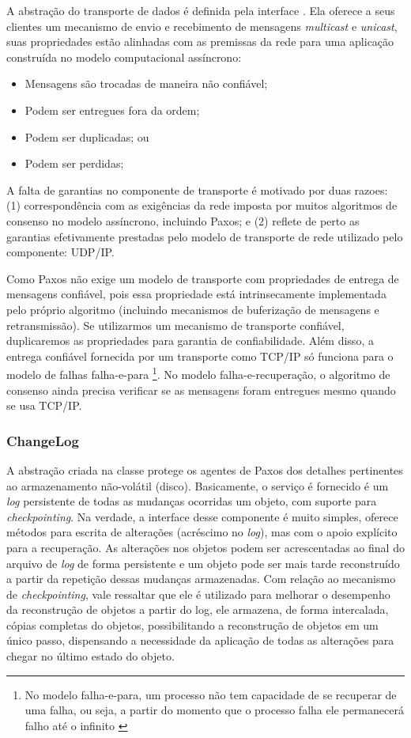 A abstração do transporte de dados é definida pela interface . Ela
oferece a seus clientes um mecanismo de envio e recebimento de mensagens \emph{multicast}
e \emph{unicast}, suas propriedades estão alinhadas com as premissas da rede para uma
aplicação construída no modelo computacional assíncrono:

\begin{itemize}
  \item Mensagens são trocadas de maneira não confiável;
  \item Podem ser entregues fora da ordem;
  \item Podem ser duplicadas; ou
  \item Podem ser perdidas;
\end{itemize}

A falta de garantias no componente de transporte é motivado por duas razoes: (1)
correspondência com as exigências da rede imposta por muitos algoritmos de consenso no
modelo assíncrono, incluindo Paxos; e (2) reflete de perto as garantias efetivamente
prestadas pelo modelo de transporte de rede utilizado pelo componente: UDP/IP.

Como Paxos não exige um modelo de transporte com propriedades de entrega de mensagens
confiável, pois essa propriedade está intrinsecamente implementada pelo próprio algoritmo
(incluindo mecanismos de buferização de mensagens e retransmissão). Se utilizarmos um
mecanismo de transporte confiável, duplicaremos as propriedades para garantia de
confiabilidade. Além disso, a entrega confiável fornecida por um transporte como TCP/IP só
funciona para o modelo de falhas falha-e-para \cite{abdellatif04} \footnote{No modelo
falha-e-para, um processo não tem capacidade de se recuperar de uma falha, ou seja, a
partir do momento que o processo falha ele permanecerá falho até o infinito
\cite{cachin11}}. No modelo falha-e-recuperação, o algoritmo de consenso ainda precisa
verificar se as mensagens foram entregues mesmo quando se usa TCP/IP.

\subsubsection{ChangeLog}

A abstração criada na classe  protege os agentes de Paxos dos
detalhes pertinentes ao armazenamento não-volátil (disco). Basicamente, o serviço é
fornecido é um \emph{log} persistente de todas as mudanças ocorridas um objeto, com
suporte para \emph{checkpointing}. Na verdade, a interface desse componente é muito
simples, oferece métodos para escrita de alterações (acréscimo no \emph{log}), mas com o
apoio explícito para a recuperação. As alterações nos objetos podem ser acrescentadas ao
final do arquivo de \emph{log} de forma persistente e um objeto pode ser mais tarde
reconstruído a partir da repetição dessas mudanças armazenadas. Com relação ao mecanismo
de \emph{checkpointing}, vale ressaltar que ele é utilizado para melhorar o desempenho da
reconstrução de objetos a partir do log, ele armazena, de forma intercalada, cópias
completas do objetos, possibilitando a reconstrução de objetos em um único passo,
dispensando a necessidade da aplicação de todas as alterações para chegar no último estado
do objeto.

